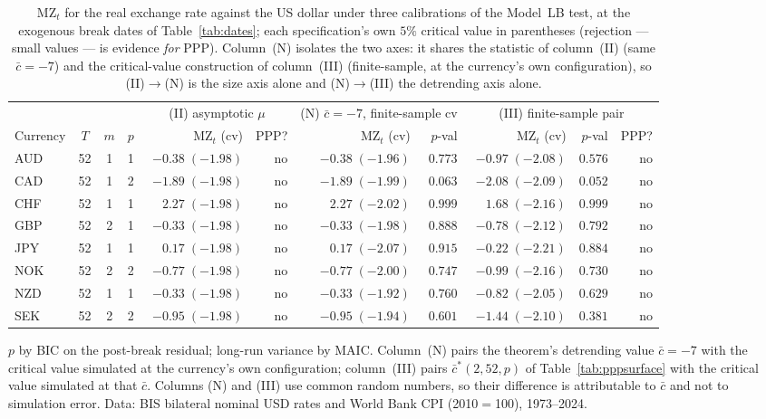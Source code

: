 \begin{table}[t!]
\centering
\caption{$\mathrm{MZ}_t$ for the real exchange rate against the US dollar
under three calibrations of the Model~LB test, at the exogenous break dates
of Table~\ref{tab:dates}; each specification's own $5\%$ critical value in
parentheses (rejection --- small values --- is evidence \emph{for} PPP).
Column~(N) isolates the two axes: it shares the statistic of column~(II)
(same $\bar c=-7$) and the critical-value construction of column~(III)
(finite-sample, at the currency's own configuration), so (II)$\to$(N) is the
size axis alone and (N)$\to$(III) the detrending axis alone.}
\label{tab:ppp}
\footnotesize
\setlength{\tabcolsep}{4pt}
\begin{tabular}{lccc rr rr rrr}
\toprule
& & & & \multicolumn{2}{c}{(II) asymptotic $\mu$}
& \multicolumn{2}{c}{(N) $\bar c=-7$, finite-sample cv}
& \multicolumn{3}{c}{(III) finite-sample pair} \\
\cmidrule(lr){5-6}\cmidrule(lr){7-8}\cmidrule(lr){9-11}
Currency & $T$ & $m$ & $p$ & $\mathrm{MZ}_t$ (cv) & PPP? &
$\mathrm{MZ}_t$ (cv) & $p$-val &
$\mathrm{MZ}_t$ (cv) & $p$-val & PPP? \\
\midrule
AUD & 52 & 1 & 1 & $-0.38\;(-1.98)$ & no & $-0.38\;(-1.96)$ & $0.773$ & $-0.97\;(-2.08)$ & $0.576$ & no \\
CAD & 52 & 1 & 2 & $-1.89\;(-1.98)$ & no & $-1.89\;(-1.99)$ & $0.063$ & $-2.08\;(-2.09)$ & $0.052$ & no \\
CHF & 52 & 1 & 1 & $\phantom{-}2.27\;(-1.98)$ & no & $\phantom{-}2.27\;(-2.02)$ & $0.999$ & $\phantom{-}1.68\;(-2.16)$ & $0.999$ & no \\
GBP & 52 & 2 & 1 & $-0.33\;(-1.98)$ & no & $-0.33\;(-1.98)$ & $0.888$ & $-0.78\;(-2.12)$ & $0.792$ & no \\
JPY & 52 & 1 & 1 & $\phantom{-}0.17\;(-1.98)$ & no & $\phantom{-}0.17\;(-2.07)$ & $0.915$ & $-0.22\;(-2.21)$ & $0.884$ & no \\
NOK & 52 & 2 & 2 & $-0.77\;(-1.98)$ & no & $-0.77\;(-2.00)$ & $0.747$ & $-0.99\;(-2.16)$ & $0.730$ & no \\
NZD & 52 & 1 & 1 & $-0.33\;(-1.98)$ & no & $-0.33\;(-1.92)$ & $0.760$ & $-0.82\;(-2.05)$ & $0.629$ & no \\
SEK & 52 & 2 & 2 & $-0.95\;(-1.98)$ & no & $-0.95\;(-1.94)$ & $0.601$ & $-1.44\;(-2.10)$ & $0.381$ & no \\
\bottomrule
\end{tabular}
\par\medskip
\footnotesize $p$ by BIC on the post-break residual; long-run variance by
MAIC. Column~(N) pairs the theorem's detrending value $\bar c=-7$ with the
critical value simulated at the currency's own configuration; column~(III)
pairs $\bar c^{*}(2,52,p)$ of Table~\ref{tab:pppsurface} with the critical
value simulated at that $\bar c$. Columns (N) and (III) use common random
numbers, so their difference is attributable to $\bar c$ and not to
simulation error. Data: BIS bilateral nominal USD rates and World Bank CPI
(2010$=$100), 1973--2024.
\end{table}
